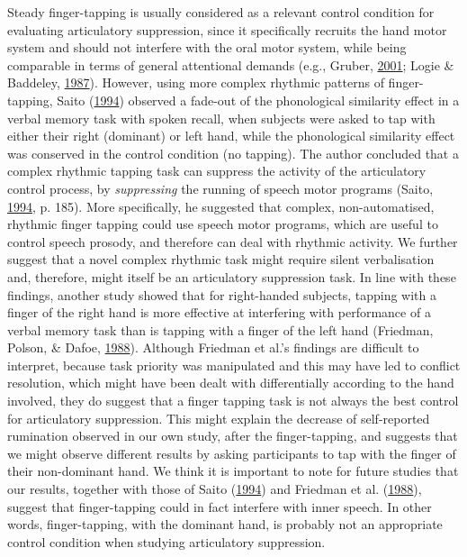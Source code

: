 \documentclass[a4paper,12pt,twoside,openright,oldfontcommands]{memoir}
\begin{document}
Steady finger-tapping is usually considered as a relevant control condition for evaluating articulatory suppression, since it specifically recruits the hand motor system and should not interfere with the oral motor system, while being comparable in terms of general attentional demands (e.g., Gruber, \protect\hyperlink{ref-gruber_effects_2001}{2001}; Logie \& Baddeley, \protect\hyperlink{ref-logie_cognitive_1987}{1987}). However, using more complex rhythmic patterns of finger-tapping, Saito (\protect\hyperlink{ref-saito_what_1994}{1994}) observed a fade-out of the phonological similarity effect in a verbal memory task with spoken recall, when subjects were asked to tap with either their right (dominant) or left hand, while the phonological similarity effect was conserved in the control condition (no tapping). The author concluded that a complex rhythmic tapping task can suppress the activity of the articulatory control process, by \emph{suppressing} the running of speech motor programs (Saito, \protect\hyperlink{ref-saito_what_1994}{1994}, p. 185). More specifically, he suggested that complex, non-automatised, rhythmic finger tapping could use speech motor programs, which are useful to control speech prosody, and therefore can deal with rhythmic activity. We further suggest that a novel complex rhythmic task might require silent verbalisation and, therefore, might itself be an articulatory suppression task. In line with these findings, another study showed that for right-handed subjects, tapping with a finger of the right hand is more effective at interfering with performance of a verbal memory task than is tapping with a finger of the left hand (Friedman, Polson, \& Dafoe, \protect\hyperlink{ref-friedman_dividing_1988}{1988}). Although Friedman et al.'s findings are difficult to interpret, because task priority was manipulated and this may have led to conflict resolution, which might have been dealt with differentially according to the hand involved, they do suggest that a finger tapping task is not always the best control for articulatory suppression. This might explain the decrease of self-reported rumination observed in our own study, after the finger-tapping, and suggests that we might observe different results by asking participants to tap with the finger of their non-dominant hand. We think it is important to note for future studies that our results, together with those of Saito (\protect\hyperlink{ref-saito_what_1994}{1994}) and Friedman et al. (\protect\hyperlink{ref-friedman_dividing_1988}{1988}), suggest that finger-tapping could in fact interfere with inner speech. In other words, finger-tapping, with the dominant hand, is probably not an appropriate control condition when studying articulatory suppression.
\end{document}
